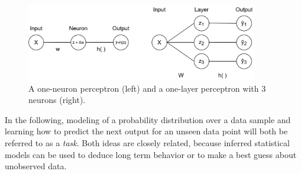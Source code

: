 \begin{figure}[h!]
	\centering
	\includegraphics[width=0.9\textwidth]{img/perceptrons.png}
	\caption{A one-neuron perceptron (left) and a one-layer perceptron with 3 neurons (right).}
	\label{fig:P}
\end{figure}

In the following, modeling of a probability distribution over a data sample and learning how to predict the next output for an unseen data point will both be referred to as a \textit{task}. Both ideas are closely related, because inferred statistical models can be used to deduce long term behavior or to make a best guess about unobserved data.
